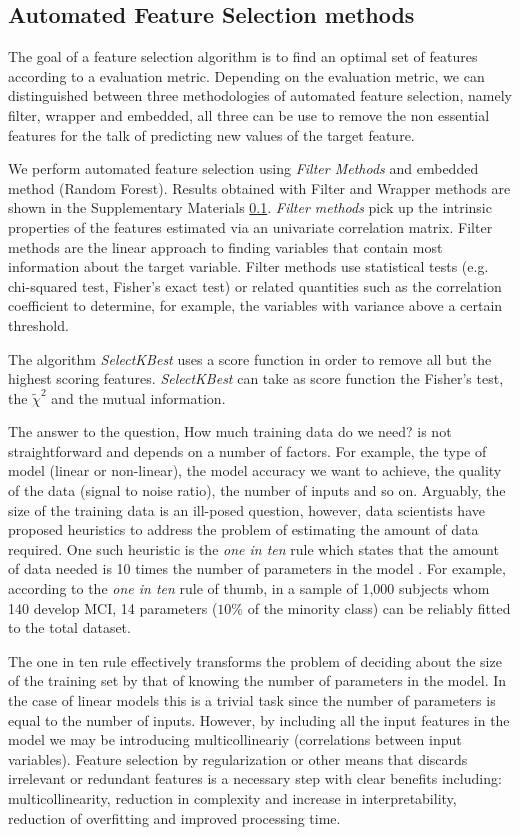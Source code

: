 \documentclass[preprint,12pt]{elsarticle}
\begin{document}
\subsection{Automated Feature Selection methods}
The goal of a feature selection algorithm is to find an optimal set of features according to a evaluation metric. Depending on the evaluation metric, we can distinguished between three methodologies of automated feature selection, namely filter, wrapper and embedded, all three can be use to remove the non essential features for the talk of predicting new values of the target feature.

We perform automated feature selection using \emph{Filter Methods} and embedded method (Random Forest). Results obtained with Filter and Wrapper methods are shown in the Supplementary Materials \ref{}. 
\emph{Filter methods} pick up the intrinsic properties of the features estimated via an univariate correlation matrix. Filter methods are the linear approach to finding variables that contain most information about the target variable. Filter methods use statistical tests (e.g. chi-squared test, Fisher's exact test) or related quantities such as the correlation coefficient to determine, for example, the variables with variance above a certain threshold.

The algorithm \emph{SelectKBest} \cite{scikit-learn} uses a score function in order to remove all but the highest scoring features. \emph{SelectKBest} can take as score function the Fisher's test, the $\tilde{\chi}^2$ and the mutual information. 

The answer to the question, How much training data do we need? is not straightforward and depends on a number of factors. For example, the type of model (linear or non-linear), the model accuracy we want to achieve, the quality of the data (signal to noise ratio), the number of inputs and so on.  
Arguably, the size of the training data is an ill-posed question, however, data scientists have proposed heuristics to address the problem of estimating the amount of data required. One such heuristic is the \emph{one in ten} rule which states that the amount of data needed is 10 times the number of parameters in the model \cite{harrell2001reg}. 
For example, according to the \emph{one in ten} rule of thumb, in a sample of 1,000 subjects whom 140 develop MCI, 14 parameters ($10\%$ of the minority class) can be reliably fitted to the total dataset. 

The one in ten rule effectively transforms the problem of deciding about the size of the training set by that of knowing the number of parameters in the model. In the case of linear models this is a trivial task since the number of parameters is equal to the number of inputs. However, by including all the input features in the model we may be introducing multicollineariy (correlations between input variables). 
Feature selection by regularization or other means that discards irrelevant or redundant features is a necessary step with clear benefits including: multicollinearity, reduction in complexity and increase in interpretability, reduction of overfitting and improved processing time.
\end{document}
